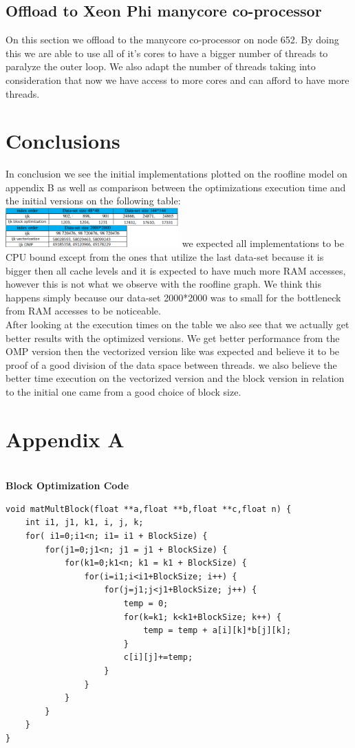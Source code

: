 \documentclass[journal]{IEEEtran}
\begin{document}
\subsection{Offload to Xeon Phi manycore co-processor}

On this section we offload to the manycore co-processor on node 652. By doing this we are able to use all of it's cores to have a bigger number of threads to paralyze the outer loop. We also adapt the number of threads taking into consideration that now we have access to more cores and can afford to have more threads.
\section{Conclusions}
In conclusion we see the initial implementations plotted on the roofline model on appendix B as well as comparison between the optimizations execution time and the initial versions on the following table:
\includegraphics[width=0.50\textwidth, left]{vala.png}
we expected all implementations to be CPU bound except from the ones that utilize the last data-set because it is bigger then all cache levels and it is expected to have much more RAM accesses, however this is not what we observe with the roofline graph. We think this happens simply because our data-set 2000*2000 was to small for the bottleneck from RAM accesses to be noticeable.\\
After looking at the execution times on the table we also see that we actually get better results with the optimized versions. We get better performance from the OMP version then the vectorized version like was expected and believe it to be proof of a good division of the data space between threads. we also believe the better time execution on the vectorized version and the block version in relation to the initial one came from a good choice of block size.


\appendix %

\section*{Appendix A}
\\
\textbf{Block Optimization Code}
\\
\begin{lstlisting}
void matMultBlock(float **a,float **b,float **c,float n) {
	int i1, j1, k1, i, j, k;
	for( i1=0;i1<n; i1= i1 + BlockSize) {
		for(j1=0;j1<n; j1 = j1 + BlockSize) {
			for(k1=0;k1<n; k1 = k1 + BlockSize) {
				for(i=i1;i<i1+BlockSize; i++) {
					for(j=j1;j<j1+BlockSize; j++) {
						temp = 0;
						for(k=k1; k<k1+BlockSize; k++) {
							temp = temp + a[i][k]*b[j][k];
						}
						c[i][j]+=temp;
					}
				}
			}
		}
    }
}
\end{lstlisting}
\end{document}
